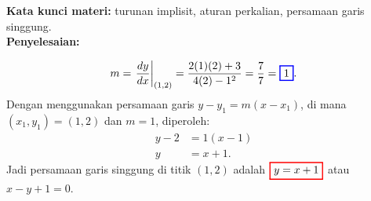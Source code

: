 \documentclass[10pt,openany,a4paper]{article}
\theoremstyle{definition}
\theoremstyle{definition}
\theoremstyle{plain}
\newenvironment{jawab}[2][tes]{%
\par\noindent\textbf{Kata kunci materi:} #1.\\
\textbf{Penyelesaian:} #2%
}{}
\begin{document}
\begin{enumerate}
\begin{jawab}[turunan implisit, aturan perkalian, persamaan garis singgung]
{\begin{enumerate}
\begin{align*}
                m=\left.\frac{dy}{dx}\right|_{(1,2)} = \frac{2(1)(2) + 3}{4(2) - 1^2}= \frac{7}{7}= \colorlet{oldcolor}{.}
        \color{blue}
        \setlength{\fboxrule}{1pt} \boxed{\color{oldcolor}1}\color{oldcolor}.
            \end{align*}
            Dengan menggunakan persamaan garis $y - y_1 = m(x - x_1)$, di mana $(x_1,y_1)=(1,2)$ dan $m=1$, diperoleh:
            \begin{align*}
                y - 2 &= 1(x - 1)\\
                y &= x + 1.
            \end{align*}
            Jadi persamaan garis singgung di titik $(1,2)$ adalah $\colorlet{oldcolor}{.}
        \color{red}
        \setlength{\fboxrule}{1pt} \boxed{\color{oldcolor}y = x + 1}\color{oldcolor}$ atau $x-y+1=0$.
        \end{enumerate}
    }
    \end{jawab}
\end{enumerate}

\newpage
\end{document}
